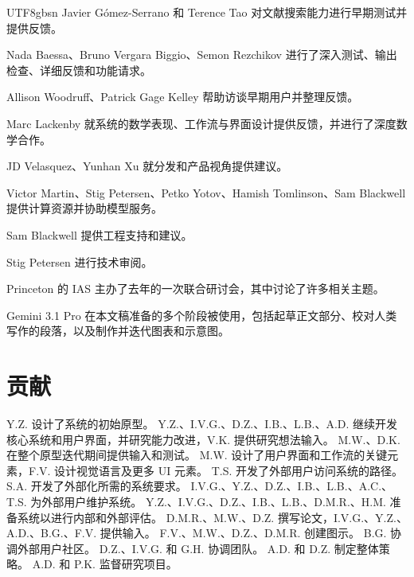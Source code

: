 \documentclass[11pt, a4paper, copyright, gdm]{google}
\begin{document}
\begin{CJK*}{UTF8}{gbsn}
Javier Gómez-Serrano 和 Terence Tao 对文献搜索能力进行早期测试并提供反馈。

Nada Baessa、Bruno Vergara Biggio、Semon Rezchikov 进行了深入测试、输出检查、详细反馈和功能请求。

Allison Woodruff、Patrick Gage Kelley 帮助访谈早期用户并整理反馈。

Marc Lackenby 就系统的数学表现、工作流与界面设计提供反馈，并进行了深度数学合作。

JD Velasquez、Yunhan Xu 就分发和产品视角提供建议。

Victor Martin、Stig Petersen、Petko Yotov、Hamish Tomlinson、Sam Blackwell 提供计算资源并协助模型服务。

Sam Blackwell 提供工程支持和建议。

Stig Petersen 进行技术审阅。

Princeton 的 IAS 主办了去年的一次联合研讨会，其中讨论了许多相关主题。

Gemini 3.1 Pro 在本文稿准备的多个阶段被使用，包括起草正文部分、校对人类写作的段落，以及制作并迭代图表和示意图。

\section*{贡献}

Y.Z. 设计了系统的初始原型。
Y.Z.、I.V.G.、D.Z.、I.B.、L.B.、A.D. 继续开发核心系统和用户界面，并研究能力改进，V.K. 提供研究想法输入。
M.W.、D.K. 在整个原型迭代期间提供输入和测试。
M.W. 设计了用户界面和工作流的关键元素，F.V. 设计视觉语言及更多 UI 元素。
T.S. 开发了外部用户访问系统的路径。
S.A. 开发了外部化所需的系统要求。
I.V.G.、Y.Z.、D.Z.、I.B.、L.B.、A.C.、T.S. 为外部用户维护系统。
Y.Z.、I.V.G.、D.Z.、I.B.、L.B.、D.M.R.、H.M. 准备系统以进行内部和外部评估。
D.M.R.、M.W.、D.Z. 撰写论文，I.V.G.、Y.Z.、A.D.、B.G.、F.V. 提供输入。
F.V.、M.W.、D.Z.、D.M.R. 创建图示。
B.G. 协调外部用户社区。
D.Z.、I.V.G. 和 G.H. 协调团队。
A.D. 和 D.Z. 制定整体策略。
A.D. 和 P.K. 监督研究项目。

\printbibliography

\clearpage
\end{CJK*}
\end{document}
